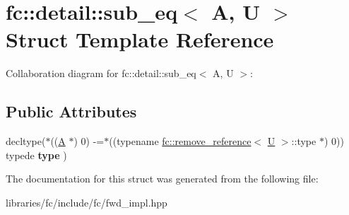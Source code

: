 \hypertarget{structfc_1_1detail_1_1sub__eq}{}\section{fc\+:\+:detail\+:\+:sub\+\_\+eq$<$ A, U $>$ Struct Template Reference}
\label{structfc_1_1detail_1_1sub__eq}


Collaboration diagram for fc\+:\+:detail\+:\+:sub\+\_\+eq$<$ A, U $>$\+:
\subsection*{Public Attributes}
\begin{DoxyCompactItemize}
\item 
\mbox{\label{structfc_1_1detail_1_1sub__eq_acc1d70bcae302805ba786acd2fd68511}} 
decltype($\ast$((\mbox{\hyperlink{struct_a}{A}} $\ast$) 0) -\/=$\ast$((typename \mbox{\hyperlink{structfc_1_1remove__reference}{fc\+::remove\+\_\+reference}}$<$ \mbox{\hyperlink{union_u}{U}} $>$\+::type $\ast$) 0)) typede {\bfseries type} )
\end{DoxyCompactItemize}


The documentation for this struct was generated from the following file\+:\begin{DoxyCompactItemize}
\item 
libraries/fc/include/fc/fwd\+\_\+impl.\+hpp\end{DoxyCompactItemize}
